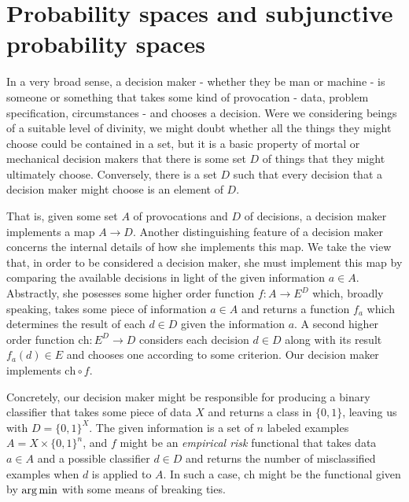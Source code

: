 


\section{Probability spaces and subjunctive probability spaces}

In a very broad sense, a decision maker - whether they be man or machine - is someone or something that takes some kind of provocation - data, problem specification, circumstances - and chooses a decision. Were we considering beings of a suitable level of divinity, we might doubt whether all the things they might choose could be contained in a set, but it is a basic property of mortal or mechanical decision makers that there is some set $D$ of things that they might ultimately choose. Conversely, there is a set $D$ such that every decision that a decision maker might choose is an element of $D$.

That is, given some set $A$ of provocations and $D$ of decisions, a decision maker implements a map $A\to D$. Another distinguishing feature of a decision maker concerns the internal details of how she implements this map. We take the view that, in order to be considered a decision maker, she must implement this map by comparing the available decisions in light of the given information $a\in A$. Abstractly, she posesses some higher order function $f:A\to E^D$ which, broadly speaking, takes some piece of information $a\in A$ and returns a function $f_a$ which determines the result of each $d\in D$ given the information $a$. A second higher order function $\mathrm{ch}:E^D\to D$ considers each decision $d\in D$ along with its result $f_a(d)\in E$ and chooses one according to some criterion. Our decision maker implements $\mathrm{ch}\circ f$.

Concretely, our decision maker might be responsible for producing a binary classifier that takes some piece of data $X$ and returns a class in $\{0,1\}$, leaving us with $D=\{0,1\}^X$. The given information is a set of $n$ labeled examples $A=X\times\{0,1\}^n$, and $f$ might be an \emph{empirical risk} functional that takes data $a\in A$ and a possible classifier $d\in D$ and returns the number of misclassified examples when $d$ is applied to $A$. In such a case, $\mathrm{ch}$ might be the functional given by $\operatorname*{arg\,min}$ with some means of breaking ties.


